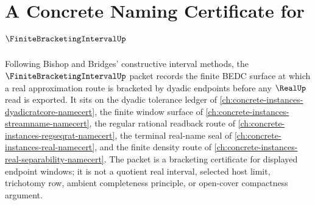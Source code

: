\chapter{A Concrete Naming Certificate for $\FiniteBracketingIntervalUp$}
\label{ch:concrete-instances-finite-bracketing-interval-namecert}

Following Bishop and Bridges' constructive interval methods, the $\FiniteBracketingIntervalUp$ packet records the finite BEDC surface at which a real approximation route is bracketed by dyadic endpoints before any $\RealUp$ read is exported. It sits on the dyadic tolerance ledger of \autoref{ch:concrete-instances-dyadicratcore-namecert}, the finite window surface of \autoref{ch:concrete-instances-streamname-namecert}, the regular rational readback route of \autoref{ch:concrete-instances-regseqrat-namecert}, the terminal real-name seal of \autoref{ch:concrete-instances-real-namecert}, and the finite density route of \autoref{ch:concrete-instances-real-separability-namecert}. The packet is a bracketing certificate for displayed endpoint windows; it is not a quotient real interval, selected host limit, trichotomy row, ambient completeness principle, or open-cover compactness argument.

